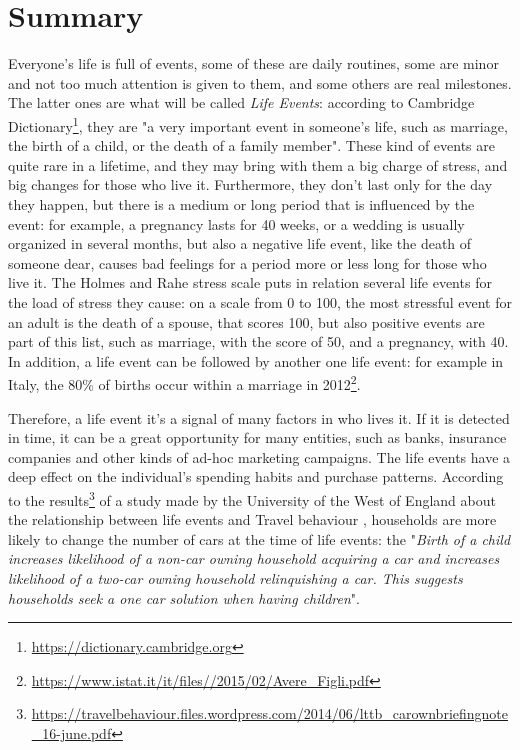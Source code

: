 \chapter*{Summary} %
\label{summary}
Everyone's life is full of events, some of these are daily routines, some are minor and not too much attention is given to them, and some others are real milestones. The latter ones are what will be called \textit{Life Events}: according to Cambridge Dictionary\footnote{\url{https://dictionary.cambridge.org}}, they are "a very important event in someone's life, such as marriage, the birth of a child, or the death of a family member". These kind of events are quite rare in a lifetime, and they may bring with them a big charge of stress, and big changes for those who live it. Furthermore, they don't last only for the day they happen, but there is a medium or long period that is influenced by the event: for example, a pregnancy lasts for 40 weeks, or a wedding is usually organized in several months, but also a negative life event, like the death of someone dear, causes bad feelings for a period more or less long for those who live it. The Holmes and Rahe stress scale \cite{holmes1967social} puts in relation several life events for the load of stress they cause: on a scale from 0 to 100, the most stressful event for an adult is the death of a spouse, that scores 100, but also positive events are part of this list, such as marriage, with the score of 50, and a pregnancy, with 40. In addition, a life event can be followed by another one life event: for example in Italy, the 80\% of births occur within a marriage in 2012\footnote{\url{https://www.istat.it/it/files//2015/02/Avere_Figli.pdf}}.

Therefore, a life event it's a signal of many factors in who lives it. If it is detected in time, it can be a great opportunity for many entities, such as banks, insurance companies and other kinds of ad-hoc marketing campaigns. The life events have a deep effect on the individual's spending habits and purchase patterns. According to the results\footnote{\url{https://travelbehaviour.files.wordpress.com/2014/06/lttb_carownbriefingnote_16-june.pdf}} of a study made by the University of the West of England about the relationship between life events and Travel behaviour \cite{chatterjee2015facts}, households are more likely to change the number of cars at the time of life events: the "\textit{Birth of a child increases likelihood of a non-car owning household acquiring a car and increases likelihood of a two-car owning household relinquishing a car. This suggests households seek a one car solution when having children}".

